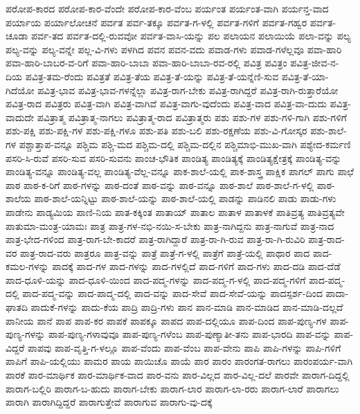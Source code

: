 ಪರೋಪ-ಕಾರದ
ಪರೋಪ-ಕಾರ-ವೆಂದೇ
ಪರೋಪ-ಕಾರ-ವೆಂಬ
ಪರ್ಯಂತ
ಪರ್ಯಂತ-ವಾಗಿ
ಪರ್ಯನ್ತ-ವಾದ
ಪರ್ಯಾಯ
ಪರ್ಯಾಲೋಚನೆ
ಪರ್ವತ
ಪರ್ವ-ತಕ್ಕೂ
ಪರ್ವತ-ಗ-ಳಲ್ಲಿ
ಪರ್ವತ-ಗಳಿಗೆ
ಪರ್ವತ-ಗಹ್ವರ
ಪರ್ವತ-ಚೂಡಾ
ಪರ್ವ-ತದ
ಪರ್ವತ-ದಲ್ಲಿ-ರುವವೋ
ಪರ್ವತ-ವಾಸಿ-ಯನ್ನು
ಪಲ
ಪಲಾಯನ
ಪಲಾಯಿಯೆ
ಪಲಾ-ವನ್ನು
ಪಲ್ಯ
ಪಲ್ಯ-ವನ್ನು
ಪಲ್ಯ-ವನ್ನೇ
ಪಲ್ಲ-ವಿ-ಗಳು
ಪಳಗಿದ
ಪವನ
ಪವನ-ವದು
ಪವಾಡ-ಗಳು
ಪವಾಡ-ಗಳೆಲ್ಲವೂ
ಪವಾ-ಹಾರಿ
ಪವಾ-ಹಾರಿ-ಬಾಬರ-ವ-ರಿಗೆ
ಪವಾ-ಹಾರಿ-ಬಾಬಾ
ಪವಾ-ಹಾರಿ-ಬಾಬಾ-ರವ-ರಲ್ಲಿ
ಪವಿತ್ರ
ಪವಿತ್ರಂ
ಪವಿತ್ರ-ಜೀವ-ನ-ದಿಯ
ಪವಿತ್ರ-ತಮ-ರೆಂದು
ಪವಿತ್ರತೆ
ಪವಿತ್ರ-ತೆಯ
ಪವಿತ್ರ-ತೆ-ಯನ್ನು
ಪವಿತ್ರ-ತೆ-ಯನ್ನೆಣಿ-ಸುವ
ಪವಿತ್ರ-ತೆ-ಯಾ-ಗಿದೆಯೋ
ಪವಿತ್ರ-ಭಾವ
ಪವಿತ್ರ-ಭಾವ-ಗಳನ್ನೆಲ್ಲಾ
ಪವಿತ್ರ-ರಾಗ-ಬೇಕು
ಪವಿತ್ರ-ರಾಗಿದ್ದರೆ
ಪವಿತ್ರ-ರಾಗಿ-ರುತ್ತಾರೆಯೋ
ಪವಿತ್ರ-ರಾದ
ಪವಿತ್ರರು
ಪವಿತ್ರ-ವಾಗಿ
ಪವಿತ್ರ-ವಾಗಿವೆ
ಪವಿತ್ರ-ವಾಗು-ವುದೆಂದು
ಪವಿತ್ರ-ವಾದ
ಪವಿತ್ರ-ವಾ-ದುದು
ಪವಿತ್ರ-ವಾದುದೇ
ಪವಿತ್ರಾತ್ಮ
ಪವಿತ್ರಾತ್ಮ-ನಾಗಲು
ಪವಿತ್ರಾತ್ಮ-ರಾದ
ಪವಿತ್ರಾತ್ಮರು
ಪಶು
ಪಶು-ಗಳ
ಪಶು-ಗಳಿ-ಗಾಗಿ
ಪಶು-ಗಳಿಗೆ
ಪಶು-ಪಕ್ಷಿ
ಪಶು-ಪಕ್ಷಿ-ಗಳ
ಪಶು-ಪಕ್ಷಿ-ಗಳೂ
ಪಶು-ಪತಿ
ಪಶು-ಬಲಿ
ಪಶು-ರಕ್ಷಣೆಯ
ಪಶು-ವಿ-ಗೋಸ್ಕರ
ಪಶು-ಶಾಲೆ-ಗಳ
ಪಶ್ಚಾತ್ತಾಪ-ವನ್ನೂ
ಪಶ್ಚಿಮ
ಪಶ್ಚಿ-ಮದ
ಪಶ್ಚಿಮ-ದಲ್ಲಿ
ಪಶ್ಚಿಮ-ದಲ್ಲಿನ
ಪಶ್ಚಿಮಾಭಿ-ಮುಖ-ವಾಗಿ
ಪಶ್ಯೇದ-ಕರ್ಮಣಿ
ಪಸರಿ-ಸಿ-ರುವೆ
ಪಸರಿ-ಸುವ
ಪಸರಿ-ಸುವನು
ಪಾಂಚ-ಭೌತಿಕ
ಪಾಂಡಿತ್ಯ
ಪಾಂಡಿತ್ಯಕ್ಕೆ
ಪಾಂಡಿತ್ಯಕ್ಷೇತ್ರಕ್ಕೆ
ಪಾಂಡಿತ್ಯ-ವನ್ನು
ಪಾಂಡಿತ್ಯ-ವನ್ನೂ
ಪಾಂಡಿತ್ಯ-ವಲ್ಲ
ಪಾಂಡಿತ್ಯ-ವೆಲ್ಲ-ವನ್ನೂ
ಪಾಕ-ಶಾಲೆ-ಯಲ್ಲಿ
ಪಾಕ-ಶಾಸ್ತ್ರ
ಪಾಕ್ಷಿಕ
ಪಾಗಲ್
ಪಾಗು
ಪಾಛೆ
ಪಾಠ
ಪಾಠ-ಕ-ರಿಗೆ
ಪಾಠ-ಗಳನ್ನು
ಪಾಠ-ದಂತೆ
ಪಾಠ-ವನ್ನು
ಪಾಠ-ವನ್ನೂ
ಪಾಠ-ಶಾಲೆ
ಪಾಠ-ಶಾಲೆ-ಗ-ಳಲ್ಲಿ
ಪಾಠ-ಶಾಲೆಯ
ಪಾಠ-ಶಾಲೆ-ಯನ್ನಿಟ್ಟು
ಪಾಠ-ಶಾಲೆ-ಯನ್ನು
ಪಾಠ-ಶಾಲೆ-ಯಲ್ಲಿ
ಪಾಡನ್ನು
ಪಾಡಿನಲಿ
ಪಾಡು
ಪಾಡು-ಗಳು
ಪಾಡೇನು
ಪಾಡ್ಯಮಿಯ
ಪಾಣಿ-ನಿಯ
ಪಾತ-ಕಕ್ಕಿಂತ
ಪಾತಾಯ್
ಪಾತಾಲ
ಪಾತಾಳ
ಪಾತಾಳಕೆ
ಪಾತಿವ್ರತ್ಯ
ಪಾತಿವ್ರತ್ಯವೇ
ಪಾತುಮಾ-ಮಂತ್ರ-ಯಾಮಃ
ಪಾತ್ರ
ಪಾತ್ರ-ಗಳ-ನಭಿ-ನಯಿ-ಸ-ಬೇಕು
ಪಾತ್ರ-ನಾಗಿದ್ದನು
ಪಾತ್ರ-ನಾಗುವೆ
ಪಾತ್ರ-ನಾದ
ಪಾತ್ರ-ಭೇದ-ಗಳಿಂದ
ಪಾತ್ರ-ರಾಗ-ಬೇ-ಕಾದರೆ
ಪಾತ್ರ-ರಾಗಿದ್ದಾರೆ
ಪಾತ್ರ-ರಾ-ಗಿ-ರುವ
ಪಾತ್ರ-ರಾ-ಗಿ-ರುವಿರಿ
ಪಾತ್ರ-ರಾದ-ವರ
ಪಾತ್ರ-ರಾದ-ವರು
ಪಾತ್ರರೂ
ಪಾತ್ರ-ವನ್ನು
ಪಾತ್ರೆ
ಪಾತ್ರೆ-ಗ-ಳಲ್ಲಿ
ಪಾತ್ರೆಗೆ
ಪಾತ್ರೆ-ಯಲ್ಲಿ
ಪಾಥಾರ
ಪಾದ
ಪಾದ-ಕಮಲ-ಗಳನ್ನು
ಪಾದಕ್ಕೆ
ಪಾದ-ಗಳ
ಪಾದ-ಗಳನ್ನು
ಪಾದ-ಗಳಲ್ಲಿದೆ
ಪಾದ-ಗಳಿಗೆ
ಪಾದ-ಗಳು
ಪಾದ-ದಡಿ
ಪಾದ-ದೆಡೆ
ಪಾದ-ಧೂಳಿ-ಯನ್ನು
ಪಾದ-ಧೂಳಿ-ಯಿಂದ
ಪಾದ-ಪದ್ಮ-ಗಳನ್ನು
ಪಾದ-ಪದ್ಮ-ಗ-ಳಲ್ಲಿ
ಪಾದ-ಪದ್ಮ-ಗಳಿಗೆ
ಪಾದ-ಪದ್ಮ-ದಲ್ಲಿ
ಪಾದ-ಪದ್ಮ-ವನ್ನು
ಪಾದ-ಪಾದ್ಮ-ದಲ್ಲಿ
ಪಾದ-ವನ್ನು
ಪಾದ-ಸೇವೆ
ಪಾದ-ಸೇವೆ-ಯನ್ನು
ಪಾದಸ್ಪರ್ಶ-ದಿಂದ
ಪಾದಾ-ಘಾತದಿ
ಪಾದುಕೆ-ಗಳನ್ನು
ಪಾದು-ಕೆಯ
ಪಾದ್ರಿ
ಪಾದ್ರಿ-ಗಳು
ಪಾನ
ಪಾನ-ಮಾಡಿ
ಪಾನ-ಮಾಡಿದ
ಪಾನ-ಮಾಡಿ-ದಲ್ಲದೆ
ಪಾನೀಯ
ಪಾನೆ
ಪಾಪ
ಪಾಪ-ಕರ
ಪಾಪಕೆ
ಪಾಪಕ್ಕೂ
ಪಾಪದ
ಪಾಪ-ದಲ್ಲಿಯೂ
ಪಾಪ-ದಿಂದ
ಪಾಪ-ಪುಣ್ಯ-ಗಳ
ಪಾಪ-ಪುಣ್ಯ-ಗಳನ್ನು
ಪಾಪ-ಪುಣ್ಯ-ಗಳಾವುವೂ
ಪಾಪ-ಪುಣ್ಯ-ಗಳೆಂಬ
ಪಾಪ-ಪುಣ್ಯಾತೀ-ತನು
ಪಾಪ-ಭಾರದಿ
ಪಾಪ-ವನ್ನು
ಪಾಪ-ವಿದ್ದರೆ
ಪಾಪವು
ಪಾಪ-ವೃತ್ತಿ-ಗ-ಳಲ್ಲೂ
ಪಾಪ-ವೆಂದು
ಪಾಪ-ವೆಂಬ
ಪಾಪ-ವೇನು
ಪಾಪಿ
ಪಾಪಿ-ಗಳನ್ನು
ಪಾಪಿ-ಗಳಿಗೆ
ಪಾಪಿಗೆ
ಪಾಪಿ-ಯಲ್ಲಿಯು
ಪಾಮರ
ಪಾಯ
ಪಾಯಿಚೊ
ಪಾಯೆ
ಪಾರ
ಪಾರಂ
ಪಾರಂಗತ-ರಾಗಲು
ಪಾರಂಪರ್ಯ-ವಾಗಿ
ಪಾರಕೆ
ಪಾರ-ಮಾರ್ಥಿಕ
ಪಾರ-ಮಾರ್ಥಿಕ-ವಾದ
ಪಾರ-ವನು
ಪಾರ-ವಿಲ್ಲದ
ಪಾರ-ವಿಲ್ಲ-ದಲೆ
ಪಾರವೇ
ಪಾರಾಗ-ದಿದ್ದಲ್ಲಿ
ಪಾರಾಗ-ಬಲ್ಲಿರಿ
ಪಾರಾಗ-ಬ-ಹುದು
ಪಾರಾಗ-ಬೇಕು
ಪಾರಾಗ-ಲಾರ
ಪಾರಾಗ-ಲಾ-ರರು
ಪಾರಾಗ-ಲಾರೆ
ಪಾರಾಗಲು
ಪಾರಾಗಿ
ಪಾರಾಗಿದ್ದಿದ್ದರೆ
ಪಾರಾಗುತ್ತೇವೆ
ಪಾರಾಗುವ
ಪಾರಾಗು-ವು-ದಕ್ಕೆ
